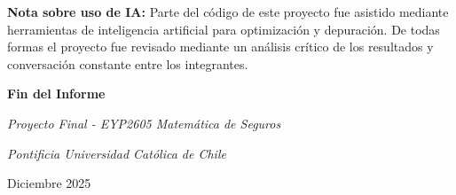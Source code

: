 \textbf{Nota sobre uso de IA:} Parte del código de este proyecto fue asistido mediante herramientas de inteligencia artificial para optimización y depuración. De todas formas el proyecto fue revisado mediante un análisis crítico de los resultados y conversación constante entre los integrantes.

\vspace{1cm}

\begin{center}
\begin{tcolorbox}[colback=celestefondo, colframe=celesteprincipal, boxrule=1.5pt, arc=4pt, width=0.9\textwidth]
\centering
\textcolor{celesteoscuro}{\textbf{Fin del Informe}}

\vspace{0.3cm}

\textcolor{grisoscuro}{\textit{Proyecto Final - EYP2605 Matemática de Seguros}}

\textcolor{grisoscuro}{\textit{Pontificia Universidad Católica de Chile}}

\vspace{0.2cm}

\textcolor{celesteprincipal}{Diciembre 2025}
\end{tcolorbox}
\end{center}
